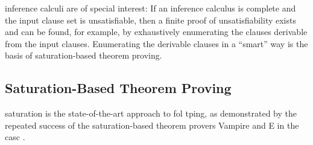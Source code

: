  inference calculi are of special interest:
If an inference calculus is complete and the input clause set is unsatisfiable,
then a finite proof of unsatisfiability exists and can be found, for example, by exhaustively enumerating the clauses derivable from the input clauses.
Enumerating the derivable clauses in a \enquote{smart} way is the basis of saturation-based theorem proving.




\subsection{Saturation-Based Theorem Proving}

\Gls{saturation} is the state-of-the-art approach to \gls{fol} \gls{tping},
as demonstrated by the repeated success of the saturation-based theorem provers Vampire \cite{DBLP:conf/cav/KovacsV13} and E \cite{DBLP:conf/cade/0001CV19} in the \gls{casc} \cite{Sut16}.

